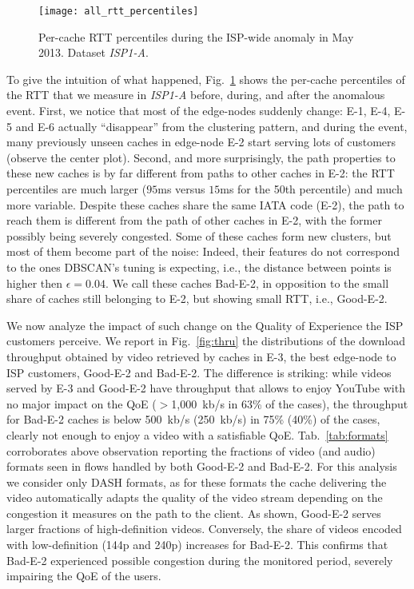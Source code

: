 \documentclass{acm_proc_article-sp}
\newcommand{\node}{{edge-node}\xspace}
\newcommand{\nodes}{{edge-nodes}\xspace}
\newcommand{\TApub}{\textit{ISP1-A}\xspace}
\newcommand{\AMS}{E-1\xspace} \newcommand{\FRA}{E-2\xspace} \newcommand{\MIL}{E-3\xspace} \newcommand{\SWI}{E-4\xspace} \newcommand{\SWII}{E-5\xspace} \newcommand{\LND}{E-6\xspace} \newcommand{\MAD}{E-7\xspace}
\begin{document}
\begin{figure}[t!]
\centering
\texttt{[image: all\_rtt\_percentiles]}
\caption{Per-cache RTT percentiles during the ISP-wide anomaly in May 2013. Dataset \TApub.}
    \label{fig:percAnom}
\end{figure}





To give the intuition of what happened, Fig.~\ref{fig:percAnom} shows the per-cache percentiles of the RTT that we measure in \TApub before, during, and after the anomalous event. 
First, we notice that most of the \nodes suddenly change: \AMS, \SWI, \SWII and \LND actually ``disappear'' from the clustering pattern, and during the event, many previously unseen caches in \node \FRA start serving lots of customers (observe the center plot). Second, and more surprisingly, the path properties to these new caches is by far different from paths to other caches in \FRA: the RTT percentiles are much larger ($95$ms versus $15$ms for the 50th percentile) and much more variable.
Despite these caches share the same IATA code (\FRA), the path to reach them is different from the path of other caches in \FRA, with the former possibly being severely congested. Some of these caches form new clusters, but most of them become part of the noise: Indeed, their features do not correspond to the ones DBSCAN's tuning is expecting, i.e., the distance between points is higher then $\epsilon=0.04$. We call these caches Bad-\FRA, in opposition to the small share of caches still belonging to \FRA, but showing small RTT, i.e., Good-\FRA.

We now analyze the impact of such change on the Quality of Experience the ISP customers perceive. We report in Fig.~\ref{fig:thru} the distributions of the download throughput obtained by video retrieved by caches in \MIL, the best \node to ISP customers, Good-\FRA and Bad-\FRA. The difference is striking: while videos served by \MIL and Good-\FRA have throughput that allows to enjoy YouTube with no major impact on the QoE ($>$1,000~kb/s in 63\% of the cases), the throughput for Bad-\FRA caches is below 500~kb/s (250~kb/s) in 75\% (40\%) of the cases, clearly not enough to enjoy a video with a satisfiable QoE.
Tab.~\ref{tab:formats} corroborates above observation reporting the fractions of video (and audio) formats seen in flows handled by both Good-\FRA and Bad-\FRA. For this analysis we consider only DASH formats, as for these formats the cache delivering the video automatically adapts the quality of the video stream depending on the congestion it measures on the path to the client.  As shown,  Good-\FRA serves larger fractions of high-definition videos. Conversely,  the share of videos encoded with low-definition (144p and 240p) increases for Bad-\FRA. This confirms that Bad-\FRA experienced possible congestion during the monitored period, severely impairing the QoE of the users.
\end{document}
